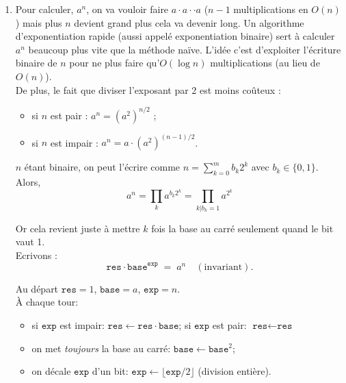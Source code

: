         

\begin{solution}
    \text{ }
    \begin{enumerate}
        \item Pour calculer, $a^n$, on va vouloir faire $a \cdot a \cdot \cdot a$ ($n-1$ multiplications en $O(n)$) mais plus $n$ devient grand plus cela va devenir long. Un algorithme d’exponentiation rapide (aussi appelé exponentiation binaire) sert à calculer $a^n$ beaucoup plus vite que la méthode naïve. L'idée c'est d'exploiter l’écriture binaire de $n$ pour ne plus faire qu’$O(\log n)$ multiplications (au lieu de $O(n)$). \\
        De plus, le fait que diviser l'exposant par 2 est moins coûteux : 
        \begin{itemize}
            \item si $n$ est pair : $a^n = (a^2)^{n/2}$ ;
            \item si $n$ est impair : $a^n = a \cdot (a^2)^{(n-1)/2}$.
        \end{itemize}

        $n$ étant binaire, on peut l'écrire comme $n=\sum_{k=0}^{m} b_k 2^k$ avec $b_k\in\{0,1\}$. Alors, 
        \[
        a^n = \prod_k a^{b_k 2^k} = \prod_{k | b_k = 1} a^{2^k}
        \]

        Or cela revient juste à mettre $k$ fois la base au carré seulement quand le bit vaut 1. \\

        
        Ecrivons : 
        \[
        \texttt{res}\cdot \texttt{base}^{\texttt{exp}} \;=\; a^{n}\quad(\text{invariant}).
        \] 

        Au départ $\texttt{res}=1$, $\texttt{base}=a$, $\texttt{exp}=n$. \\
        À chaque tour:
        \begin{itemize}
          \item si $\texttt{exp}$ est impair: $\texttt{res}\leftarrow \texttt{res}\cdot \texttt{base}$; si $\texttt{exp}$ est pair: $\texttt{res}\leftarrow \texttt{res}$
          \item on met \emph{toujours} la base au carré: $\texttt{base}\leftarrow \texttt{base}^2$;
          \item on décale $\texttt{exp}$ d'un bit: $\texttt{exp}\leftarrow \lfloor \texttt{exp}/2\rfloor$ (division entière).
        \end{itemize}
        \text{ }


\end{enumerate}
\end{solution}
